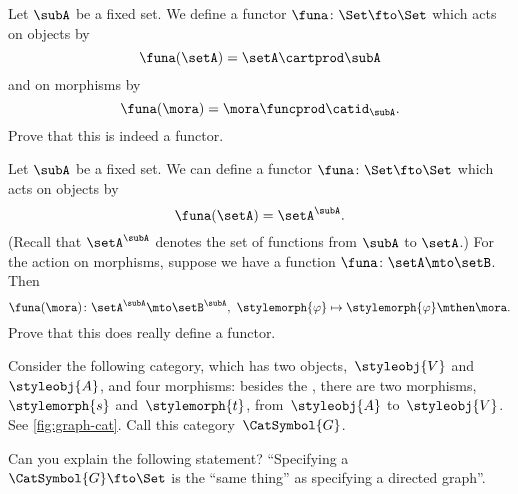 \begin{gradedexercise}
    \label{ex:MultiplicationWithASet}
    Let $\subA$ be a fixed set. We define a functor $\funa \colon \Set \fto \Set$ which acts on objects by 
    \begin{equation}
\funa(\setA) = \setA \cartprod \subA
\end{equation}
and on morphisms by 
 \begin{equation}
\funa(\mora) = \mora \funcprod \catid_{\subA}.
\end{equation}
Prove that this is indeed a functor.
    \end{gradedexercise}

\begin{gradedexercise}
    \label{ex:ExponentiationWithASet}
    Let $\subA$ be a fixed set. We can define a functor $\funa \colon \Set \fto \Set$ which acts on objects by 
    \begin{equation}
\funa(\setA) = \setA^\subA.
\end{equation}
(Recall that $\setA^\subA$ denotes the set of functions from $\subA$ to $\setA$.)
For the action on morphisms, suppose we have a function $\funa \colon \setA \mto \setB$. Then
 \begin{equation}
\funa(\mora) \colon \setA^\subA \mto \setB^\subA, \ \stylemorph{\varphi} \mapsto \stylemorph{\varphi} \mthen \mora.
\end{equation}
Prove that this does really define a functor.
    \end{gradedexercise}




\begin{gradedexercise}
    \label{ex:GraphsViaFunctors}
    Consider the following category, which has two objects,~$\styleobj{V}$ and~$\styleobj{A}$, and four morphisms: besides the , there are two morphisms,~$\stylemorph{s}$ and~$\stylemorph{t}$, from~$\styleobj{A}$ to~$\styleobj{V}$.
    See \cref{fig:graph-cat}.
    Call this category~$\CatSymbol{G}$.

    Can you explain the following statement?
    ``Specifying a ~$\CatSymbol{G} \fto \Set$ is the ``same thing'' as specifying a directed graph''.
\end{gradedexercise}


\begin{marginfigure}
    \centering
    \caption{}
    \label{fig:graph-cat}
\end{marginfigure}

